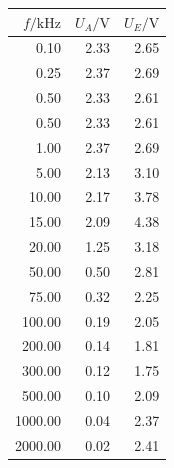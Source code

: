 \documentclass[]{scrartcl}
\begin{document}
\begin{table}[H]
	\centering
	\label{tab:ggverst_d}
	\hskip-1.50cm
	\begin{tabular}{r r r}
		\toprule
		$f / \si{\kilo\hertz}$ & $U_A/\si{\volt}$ & $U_E/\si{\volt}$ \\
		\midrule
		0.10	&	2.33	&	2.65 \\
		0.25	&	2.37	&	2.69 \\
		0.50	&	2.33	&	2.61 \\
		0.50	&	2.33	&	2.61 \\
		1.00	&	2.37	&	2.69 \\
		5.00	&	2.13	&	3.10 \\
		10.00	&	2.17	&	3.78 \\
		15.00	&	2.09	&	4.38 \\
		20.00	&	1.25	&	3.18 \\
		50.00	&	0.50	&	2.81 \\
		75.00	&	0.32	&	2.25 \\
		100.00	&	0.19	&	2.05 \\
		200.00	&	0.14	&	1.81 \\
		300.00	&	0.12	&	1.75 \\
		500.00	&	0.10	&	2.09 \\
		1000.00	&	0.04	&	2.37 \\
		2000.00	&	0.02	&	2.41 \\	
		\bottomrule
	\end{tabular}
\end{table}
		
\end{document}
